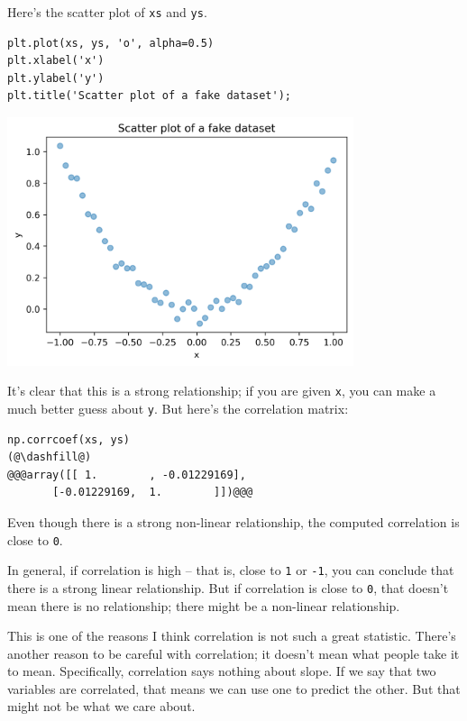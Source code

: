 Here's the scatter plot of \passthrough{\lstinline!xs!} and
\passthrough{\lstinline!ys!}.

\begin{lstlisting}[]
plt.plot(xs, ys, 'o', alpha=0.5)
plt.xlabel('x')
plt.ylabel('y')
plt.title('Scatter plot of a fake dataset');
\end{lstlisting}

\begin{center}
\includegraphics[width=4in]{chapters/09_relationships_files/09_relationships_62_0.png}
\end{center}

It's clear that this is a strong relationship; if you are given
\passthrough{\lstinline!x!}, you can make a much better guess about
\passthrough{\lstinline!y!}. But here's the correlation matrix:

\begin{lstlisting}[]
np.corrcoef(xs, ys)
(@\dashfill@)
@@@array([[ 1.        , -0.01229169],
       [-0.01229169,  1.        ]])@@@
\end{lstlisting}

Even though there is a strong non-linear relationship, the computed
correlation is close to \passthrough{\lstinline!0!}.

In general, if correlation is high -- that is, close to
\passthrough{\lstinline!1!} or \passthrough{\lstinline!-1!}, you can
conclude that there is a strong linear relationship. But if correlation
is close to \passthrough{\lstinline!0!}, that doesn't mean there is no
relationship; there might be a non-linear relationship.

This is one of the reasons I think correlation is not such a great
statistic. There's another reason to be careful with correlation; it
doesn't mean what people take it to mean. Specifically, correlation says
nothing about slope. If we say that two variables are correlated, that
means we can use one to predict the other. But that might not be what we
care about.

